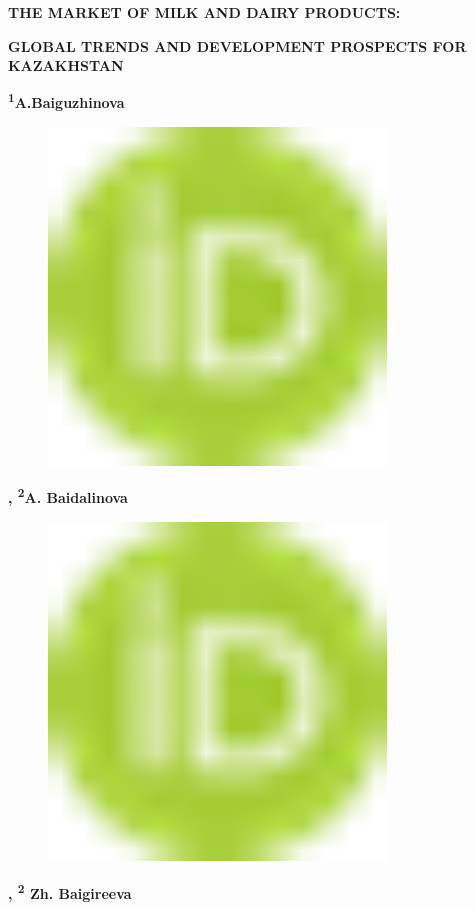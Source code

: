 
{\bfseries THE MARKET OF MILK AND DAIRY PRODUCTS:}

{\bfseries GLOBAL TRENDS AND DEVELOPMENT PROSPECTS FOR KAZAKHSTAN}

{\bfseries \textsuperscript{1}A.Baiguzhinova}
\begin{figure}[H]
	\centering
	\includegraphics[width=0.8\textwidth]{media/ekon/image1}
	\caption*{}
\end{figure}
{\bfseries ,
\textsuperscript{2}A.
Baidalinova}
\begin{figure}[H]
	\centering
	\includegraphics[width=0.8\textwidth]{media/ekon/image1}
	\caption*{}
\end{figure}
{\bfseries \textsuperscript{\envelope },
\textsuperscript{2} Zh. Baigireeva}

